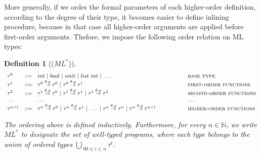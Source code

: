 \documentclass[a4paper,11pt,oneside]{article}
\theoremstyle{plain}
\newtheorem{definition}{Definition}[subsection]
\begin{document}
 	More generally, if we order the formal parameters of each higher-order definition, according to the degree of their type, it becomes easier to define inlining procedure, because in that case all higher-order arguments are applied before first-order arguments. 
  Thefore, we impose the following order relation on ML types:
\begin{definition}[($ML^{^{n}}$)]
\begin{displaymath}
	\begin{array}{lll@{\hspace*{2cm}}l}
	\tau^0 & ::= & int~|~bool~|~unit~|~list~int~|~\dots~ & \textsc{base
          type} \\ \tau^1 & ::= & \tau^0 \stackrel{\theta, \rho}{\rightarrow}
        \tau^0 ~|~ \tau^0 \stackrel{\theta, \rho}{\rightarrow} \tau^1 &
        \textsc{first-order functions}\\ \tau^2 & ::= & \tau^1 \stackrel{\theta,
          \rho}{\rightarrow} \tau^0 ~|~ \tau^1 \stackrel{\theta,
          \rho}{\rightarrow} \tau^1 ~|~ \tau^1 \stackrel{\theta,
          \rho}{\rightarrow} \tau^2
	& \textsc{second-order functions} \\ \dots & & \dots & \dots
        \\ \tau^{n+1} & ::= & \tau^{n} \stackrel{\theta, \rho}{\rightarrow}
        \tau^0 ~|~ \tau^{n} \stackrel{\theta, \rho}{\rightarrow} \tau^1 ~|~
        \dots ~|~ \tau^{n} \stackrel{\theta, \rho}{\rightarrow} \tau^{n} ~|~
        \tau^{n} \stackrel{\theta, \rho}{\rightarrow}\tau^{n+1}
	& \textsc{higher-order functions} \\
	
	\end{array}
\end{displaymath}
\label{MLn-ty-d}

The ordering above is defined inductively. Furthermore, for every $n \in \mathbb{N}$, we write $ML^{^{n}}$ to designate the set of well-typed programs, where each type belongs to the union of ordered types $\bigcup_{~0 0 \leq i \leq n} \tau^i$.
\end{definition}
\end{document}

